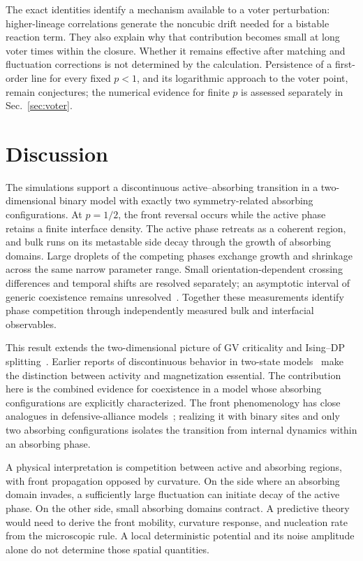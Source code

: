 \documentclass[pre,twocolumn,superscriptaddress,showpacs,floatfix]{revtex4-2}
\begin{document}
The exact identities identify a mechanism available to a voter perturbation:
higher-lineage correlations generate the noncubic drift needed for a bistable
reaction term. They also explain why that contribution becomes small at long
voter times within the closure. Whether it remains effective after matching
and fluctuation corrections is not determined by the calculation. Persistence
of a first-order line for every fixed $p<1$, and its logarithmic approach to
the voter point, remain conjectures; the numerical evidence for finite $p$
is assessed separately in Sec.~\ref{sec:voter}.

\section{Discussion}
\label{sec:discussion}

The simulations support a discontinuous active--absorbing transition in a two-dimensional
binary model with exactly two symmetry-related absorbing configurations. At $p=1/2$, the
front reversal occurs while the active phase retains a finite interface density.
The active phase retreats as a coherent region, and bulk runs on its metastable side
decay through the growth of absorbing domains. Large droplets of the competing phases
exchange growth and shrinkage across the same narrow parameter range.
Small orientation-dependent crossing differences and temporal shifts are
resolved separately; an asymptotic interval of generic coexistence
remains unresolved~\cite{wang2015,liu2018}.
Together these measurements identify phase competition through independently measured
bulk and interfacial observables.

This result extends the two-dimensional picture of GV criticality and
Ising--DP splitting~\cite{dornic2001,droz2003,alhammal2005}. Earlier reports of discontinuous
behavior in two-state models~\cite{rodrigues2015} make the distinction between activity and
magnetization essential. The contribution here is the combined evidence for coexistence
in a model whose absorbing configurations are explicitly characterized.
The front phenomenology has close analogues in defensive-alliance
models~\cite{szabo2004,guisoni2013}; realizing it with binary sites and only two absorbing
configurations isolates the transition from internal dynamics within an absorbing phase.

A physical interpretation is competition between active and absorbing regions,
with front propagation opposed by curvature. On the side where an absorbing domain
invades, a sufficiently large fluctuation can initiate decay of the active phase.
On the other side, small absorbing domains contract.
A predictive theory would need to derive the front mobility, curvature response,
and nucleation rate from the microscopic rule. A local deterministic potential and
its noise amplitude alone do not determine those spatial quantities.
\end{document}
